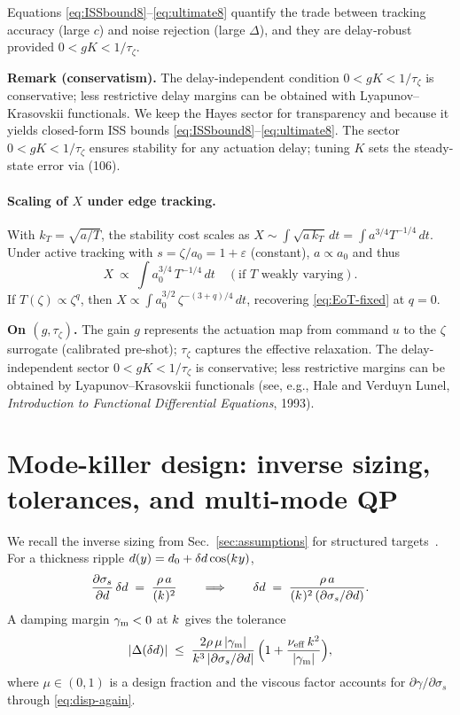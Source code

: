 \documentclass[aps,pre,twocolumn,showpacs,superscriptaddress]{revtex4-2}
\theoremstyle{definition}
\newcommand{\tauz}{\tau_\zeta}
\begin{document}
\medskip
Equations \eqref{eq:ISSbound8}–\eqref{eq:ultimate8} quantify the trade between tracking accuracy (large $c$) and noise rejection (large $\Delta$), and they are delay‑robust provided $0<gK<1/\tauz$.

\noindent\textbf{Remark (conservatism).}
The delay-independent condition $0<gK<1/\tauz$ is conservative; less restrictive delay margins can be obtained with Lyapunov–Krasovskii functionals. We keep the Hayes sector for transparency and because it yields closed-form ISS bounds \eqref{eq:ISSbound8}–\eqref{eq:ultimate8}. The sector $0<gK<1/\tau_\zeta$ ensures stability for any actuation delay; tuning $K$ sets the steady-state error via (106).

\paragraph*{Scaling of $X$ under edge tracking.}
With $k_T=\sqrt{a/T}$, the stability cost scales as $X\sim\int\sqrt{a\,k_T}\,dt=\int a^{3/4}T^{-1/4}\,dt$. Under active tracking with $s=\zeta/a_0=1+\varepsilon$ (constant), $a\propto a_0$ and thus
\begin{equation}\label{eq:EoT-fixed}
X\ \propto\ \int a_0^{3/4}\,T^{-1/4}\,dt \quad (\text{if $T$ weakly varying}).
\end{equation}
If $T(\zeta)\propto \zeta^q$, then $X\propto \int a_0^{3/2}\,\zeta^{-(3+q)/4}\,dt$, recovering \eqref{eq:EoT-fixed} at $q=0$.

\noindent\textbf{On $(g,\tau_\zeta)$.}
The gain $g$ represents the actuation map from command $u$ to the $\zeta$ surrogate (calibrated pre-shot); $\tau_\zeta$ captures the effective relaxation. The delay-independent sector $0<gK<1/\tau_\zeta$ is conservative; less restrictive margins can be obtained by Lyapunov–Krasovskii functionals (see, e.g., Hale and Verduyn Lunel, \emph{Introduction to Functional Differential Equations}, 1993).

\section{Mode-killer design: inverse sizing, tolerances, and multi-mode QP}\label{sec:modekiller}

We recall the inverse sizing from Sec.~\ref{sec:assumptions} for structured targets~\cite{Passoni2016PRAB,Bin2018PRL,Prencipe2016PPCF}. For a thickness ripple $d(y)=d_0+\delta d\cos(k^{\*} y)$,
\begin{equation}\label{eq:mk9}
\frac{\partial\sigma_s}{\partial d}\,\delta d\;=\;\frac{\rho\,a}{(k^{\*})^{2}}\qquad\Longrightarrow\qquad
\delta d\;=\;\frac{\rho\,a}{(k^{\*})^{2}\,(\partial\sigma_s/\partial d)}.
\end{equation}
A damping margin $\gamma_{\rm m}<0$ at $k^{\*}$ gives the tolerance
\begin{equation}\label{eq:tol9}
|\Delta(\delta d)| \;\le\; \frac{2\rho\,\mu\,|\gamma_{\rm m}|}{k^{\*3}\,|\partial\sigma_s/\partial d|}\,\Big(1+\frac{\nu_{\rm eff}\,k^{\*2}}{|\gamma_{\rm m}|}\Big),
\end{equation}
where $\mu\in(0,1)$ is a design fraction and the viscous factor accounts for $\partial\gamma/\partial\sigma_s$ through \eqref{eq:disp-again}.
\end{document}
